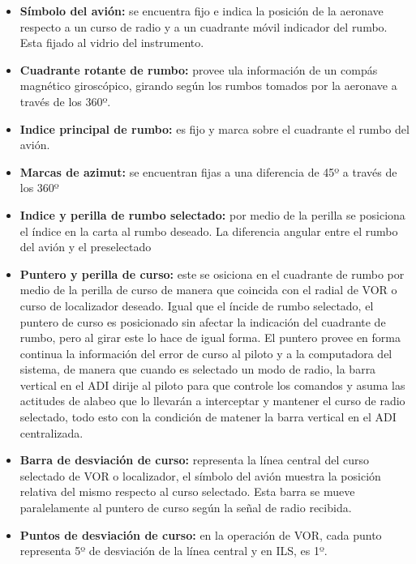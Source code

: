 \documentclass[a4paper,12pt,twoside]{article}
\begin{document}
\begin{itemize}
	\item {\bf S\'imbolo del avi\'on:} se encuentra fijo e indica la
		posici\'on de la aeronave respecto a un curso de radio
		y a un cuadrante m\'ovil indicador del rumbo. Esta fijado
		al vidrio del instrumento.

        \item {\bf Cuadrante rotante de rumbo:} provee ula informaci\'on de un
	comp\'as magn\'etico girosc\'opico, girando seg\'un los rumbos tomados por
	la aeronave a trav\'es de los 360º.

        \item {\bf Indice principal de rumbo: } 
	es fijo y marca sobre el cuadrante el rumbo del avi\'on.

        \item {\bf Marcas de azimut: }
	se encuentran fijas a una diferencia de 45º a trav\'es de los 360º

        \item {\bf Indice y perilla de rumbo selectado: }
	por medio de la perilla se posiciona el \'indice en la carta al rumbo
	deseado. La diferencia angular entre el rumbo del avi\'on y el preselectado
	

        \item {\bf Puntero y perilla de curso: } este se osiciona en el cuadrante de 
	rumbo por medio de la perilla de curso de manera que
	coincida con el radial de VOR o curso de localizador deseado.
	Igual que el \'incide de rumbo selectado, el puntero de curso es posicionado
	sin afectar la indicaci\'on del cuadrante de rumbo, pero al girar este
	lo hace de igual forma.
	El puntero provee en forma continua la informaci\'on del error de curso
	al piloto y a la computadora del sistema, de manera que 
	cuando es selectado un modo de radio, la barra vertical en el ADI
	dirije al piloto para que controle los comandos y asuma las actitudes
	de alabeo que lo llevar\'an a interceptar y mantener el curso de radio
	selectado, todo esto con la condici\'on de matener la barra vertical en el 
	ADI centralizada.

      \item {\bf Barra de desviaci\'on de curso: }
	representa la l\'inea central del curso selectado de VOR o localizador, 
	el s\'imbolo del avi\'on muestra la posici\'on relativa del mismo
	respecto al curso selectado. Esta barra se mueve paralelamente al puntero
	de curso seg\'un la se\~nal de radio recibida.

      \item {\bf Puntos de desviaci\'on de curso: }
	en la operaci\'on de VOR, cada punto representa 5º de desviaci\'on de la l\'inea
	central y en ILS, es 1º.


\end{itemize}
\end{document}
